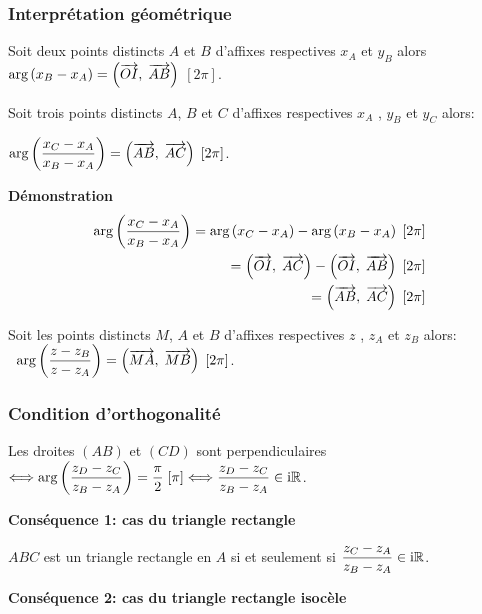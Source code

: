 \subsubsection*{Interprétation géométrique }
Soit deux points distincts  $A $ et $ B$ d'affixes respectives $ x_A$ et $y_B $ alors $ \text{arg}\left(x_B - x_A\right) =\left( \overrightarrow{OI},\;\overrightarrow{AB} \right)$\; $ [2\pi]$.

Soit trois points distincts  $A $, $ B$ et $ C$ d'affixes respectives $ x_A$ , $y_B $  et $y_C $ alors:

\medskip
 $ \text{arg}\left(\dfrac{x_C - x_A}{x_B - x_A}\right) =\left( \overrightarrow{AB},\;\overrightarrow{AC} \right) \; [2\pi]$.
 
 \bigskip
 
 \textbf{Démonstration}
 \begin{align*}
  \text{arg}\left(\dfrac{x_C - x_A}{x_B - x_A}\right)= \text{arg}\left(x_C - x_A\right)- \text{arg}\left(x_B - x_A\right)\; [2\pi]& \\=\left( \overrightarrow{OI},\;\overrightarrow{AC} \right)-\left( \overrightarrow{OI},\;\overrightarrow{AB} \right)\; [2\pi]&\\=\left( \overrightarrow{AB},\;\overrightarrow{AC} \right)  \; [2\pi]
  \end{align*}
  \begin{corollary}
  Soit les points distincts $M $, $ A $  et $ B$ d'affixes respectives $ z$ , $z_A $  et $z_B $ alors:
  $\;\; \text{arg}\left(\dfrac{z - z_B}{z - z_A}\right) =\left( \overrightarrow{MA},\;\overrightarrow{MB} \right) \; [2\pi]$.
  
 \end{corollary}
  \subsubsection*{Condition d'orthogonalité }
  
  Les droites $(AB) $ et $(CD) $ sont perpendiculaires  $ \Longleftrightarrow  \text{arg}\left(\dfrac{z_D - z_C}{z_B - z_A}\right) =\dfrac{\pi}{2} \; [\pi] \Longleftrightarrow \dfrac{z_D - z_C}{z_B - z_A}\in\text{i}\mathbb{R}$. 
  
  \medskip
  
  \textbf{Conséquence 1: cas du triangle rectangle }
  
  \medskip
  
  $ ABC $ est un triangle rectangle en $ A $ si et seulement si   $ \dfrac{z_C - z_A}{z_B - z_A} \in\text{i}\mathbb{R} $.
  \medskip
  
  \textbf{Conséquence 2: cas du triangle rectangle  isocèle}
  
